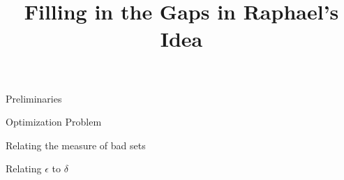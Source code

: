\documentclass[letterpaper,11pt]{paper}
\title{Filling in the Gaps in Raphael's Idea}
\begin{document}
\maketitle

\begin{section}{Preliminaries}

\end{section}
\begin{section}{Optimization Problem}

\end{section}
\begin{section}{Relating the measure of bad sets}

\end{section}
\begin{section}{Relating $\epsilon$ to $\delta$}

\end{section}


\end{document}
